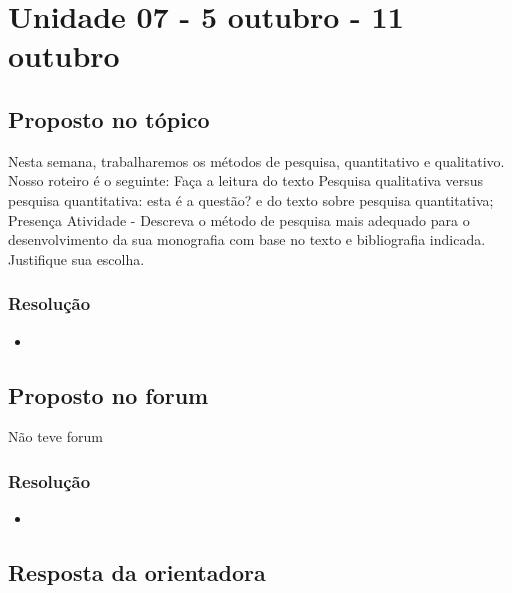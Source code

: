 

\chapter{Unidade 07 - 5 outubro - 11 outubro}

\section{Proposto no tópico}

Nesta semana, trabalharemos os métodos de pesquisa, quantitativo e qualitativo.
Nosso roteiro é o seguinte:
	Faça a leitura do texto Pesquisa qualitativa versus pesquisa quantitativa: esta é a questão? e do texto sobre pesquisa quantitativa;
	Presença Atividade - Descreva o método de pesquisa mais adequado para o desenvolvimento da sua monografia com base no texto e bibliografia indicada. Justifique sua escolha.

\subsection{Resolução}


\begin{itemize}
  \item 
\end{itemize}

\section{Proposto no forum}

Não teve forum


\subsection{Resolução}

\begin{itemize}
	\item 
\end{itemize}

\section{Resposta da orientadora}

